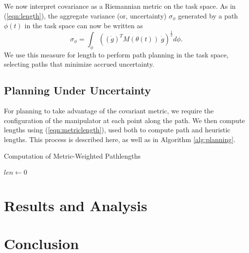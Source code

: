 \documentclass[10pt,conference]{ieeeconf}
\begin{document}
We now interpret covariance as a Riemannian metric on the task space.
As in (\ref{eqn:length}), the aggregate variance (or, uncertainty) $\sigma_\phi$ generated by a path $\phi(t)$ in the task space can now be written as
\begin{equation}\label{eqn:metriclength}
    \sigma_\phi = \int_\phi \left((\dot{g})^T M(\theta(t))\;\dot{g}\right)^\frac{1}{2} d\phi.
\end{equation}
We use this measure for length to perform path planning in the task space, selecting paths that minimize accrued uncertainty.

\subsection{Planning Under Uncertainty}
For planning to take advantage of the covariant metric, we require the configuration of the manipulator at each point along the path.
We then compute lengths using (\ref{eqn:metriclength}), used both to compute path and heuristic lengths.
This process is described here, as well as in Algorithm \ref{alg:planning}.
\begin{algorithm}[tb]\label{alg:planning}
    \caption{Computation of Metric-Weighted Pathlengths}

    $len \gets 0$\\
\end{algorithm}


\section{Results and Analysis}\label{sec:analysis}

\section{Conclusion}\label{sec:conclusion}



\end{document}

